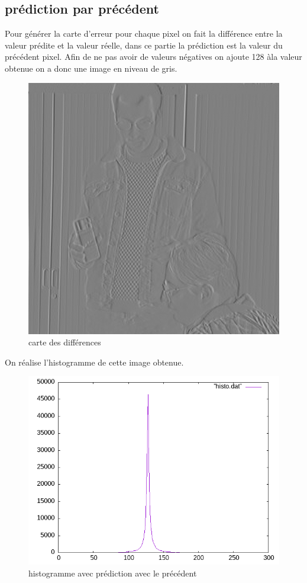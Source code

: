 \documentclass{article}
\begin{document}
\subsection{prédiction par précédent}
Pour générer la carte d'erreur pour chaque pixel on fait la différence entre la valeur prédite et la valeur réelle, dans ce partie la prédiction est la valeur du précédent pixel.
Afin de ne pas avoir de valeurs négatives on ajoute 128 àla valeur obtenue on a donc une image en niveau de gris.
\begin{figure}[h]
\centerline{\includegraphics[scale=0.4]{./rendus/MaribaultErreurPredPrec.png} }
\caption{carte des différences}
\end{figure}

On réalise l'histogramme de cette image obtenue.

\begin{figure}[h]
\centerline{\includegraphics[scale=0.5]{./rendus/histoPredPrec.png} }
\caption{histogramme avec prédiction avec le précédent}
\end{figure}
\end{document}
